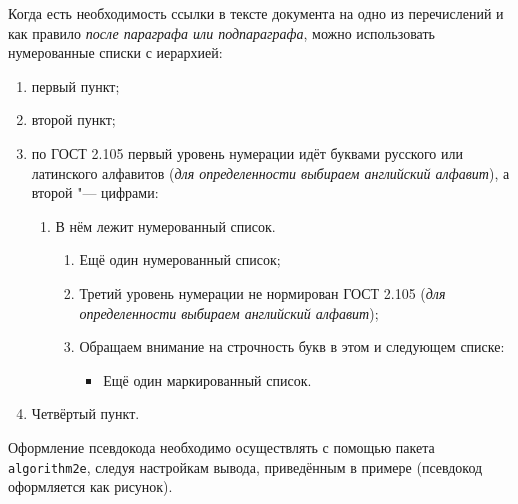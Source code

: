 \begin{refsection}
	Когда есть необходимость ссылки в тексте документа на одно из перечислений и как правило {\itshape после параграфа или подпараграфа}, можно использовать нумерованные списки с иерархией:
	\begin{enumerate}
		\item первый пункт;
		\item второй пункт;
		\item по ГОСТ 2.105 первый уровень нумерации идёт буквами русского или латинского алфавитов ({\itshape для определенности выбираем английский алфавит}),
		а второй "--- цифрами: 
		\begin{enumerate}
			\item В нём лежит нумерованный список.
			\begin{enumerate}
				\item Ещё один нумерованный список;
				\item Третий уровень нумерации не нормирован ГОСТ 2.105 ({\itshape для определенности выбираем английский алфавит});
				\item Обращаем внимание на строчность букв в этом и следующем списке:
				\begin{itemize}
					\item Ещё один маркированный список.
				\end{itemize}    
			\end{enumerate}
		\end{enumerate}
		\item Четвёртый пункт.
	\end{enumerate}
	
	
	
	Оформление псевдокода необходимо осуществлять с помощью пакета \verb|algorithm2e|, следуя настройкам вывода, приведённым в примере (псевдокод оформляется как рисунок).
	

\end{refsection}
